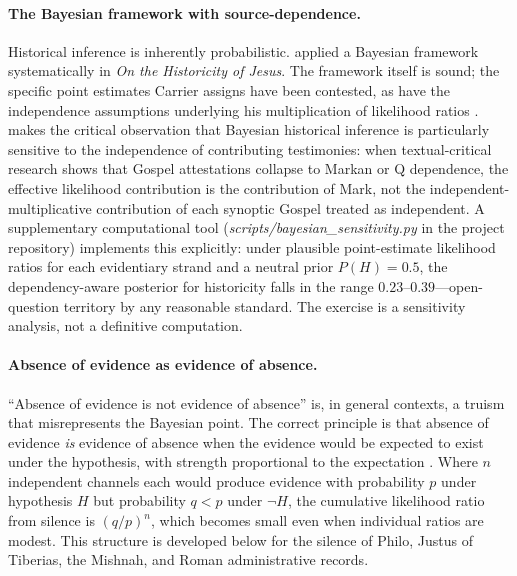 \documentclass[12pt,oneside]{article}
\begin{document}
\paragraph{The Bayesian framework with source-dependence.}
Historical inference is inherently probabilistic.  \citet{Carrier2014}
applied a Bayesian framework systematically in \textit{On the
Historicity of Jesus}.  The framework itself is sound; the specific
point estimates Carrier assigns have been contested, as have the
independence assumptions underlying his multiplication of likelihood
ratios \citep{Vridar2014,Tucker2004}.  \citet{Tucker2004} makes the
critical observation that Bayesian historical inference is
particularly sensitive to the independence of contributing
testimonies: when textual-critical research shows that Gospel
attestations collapse to Markan or Q dependence, the effective
likelihood contribution is the contribution of Mark, not the
independent-multiplicative contribution of each synoptic Gospel
treated as independent.  A supplementary computational tool
(\textit{scripts/bayesian\_sensitivity.py} in the project repository)
implements this explicitly: under plausible point-estimate
likelihood ratios for each evidentiary strand and a neutral prior
$P(H)=0.5$, the dependency-aware posterior for historicity falls in
the range $0.23$--$0.39$---open-question territory by any reasonable
standard.  The exercise is a sensitivity analysis, not a definitive
computation.

\paragraph{Absence of evidence as evidence of absence.}
\enquote{Absence of evidence is not evidence of absence} is, in
general contexts, a truism that misrepresents the Bayesian point.
The correct principle is that absence of evidence \textit{is}
evidence of absence when the evidence would be expected to exist
under the hypothesis, with strength proportional to the
expectation \citep{Sober2009,Carrier2012}.  Where $n$ independent
channels each would produce evidence with probability $p$ under
hypothesis $H$ but probability $q < p$ under $\neg H$, the
cumulative likelihood ratio from silence is $(q/p)^n$, which
becomes small even when individual ratios are modest.  This
structure is developed below for the silence of Philo, Justus of
Tiberias, the Mishnah, and Roman administrative records.
\end{document}

